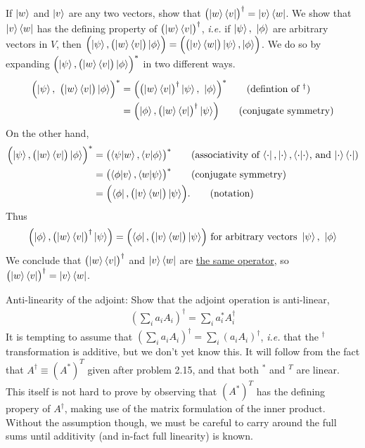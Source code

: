  If $\ket{w}$ and $\ket{v}$ are any two vectors, show that $\bigl(\ket{w}\bra{v}\bigr)^\dagger = \ket{v}\bra{w}$.
\Soln We show that $\ket{v}\bra{w}$ has the defining property of $\bigl(\ket{w}\bra{v}\bigr)^\dagger$, \textit{i.e.} if $\ket{\psi},\ \ket{\phi}$ are arbitrary vectors in $V$, then $\Bigl(\ket{\psi}, \bigl(\ket{w}\bra{v}\bigr)\ket{\phi}\Bigr) = \Bigl(\bigl(\ket{v}\bra{w}\bigr)\ket{\psi}, \ket{\phi}\Bigr)$.  We do so by expanding $\Bigl(\ket{\psi}, \bigl(\ket{w}\bra{v}\bigr)\ket{\phi}\Bigr)^*$ in two different ways. 
\begin{align*}
	\Bigl(\ket{\psi},\ \bigl(\ket{w}\bra{v}\bigr) \ket{\phi}\Bigr)^* &=
	\Bigl(\bigl(\ket{w}\bra{v}\bigr)^\dagger \ket{\psi},\  \ket{\phi}\Bigr)^* \tag{defintion of $^\dagger$}\\
	&= \Bigl(\ket{\phi},\bigl(\ket{w}\bra{v}\bigr)^\dagger \ket{\psi} \Bigr) \tag{conjugate symmetry}
\end{align*}
On the other hand,
\begin{align*}
	\Bigl(\ket{\psi},\bigl(\ket{w}\bra{v}\bigr) \ket{\phi}\Bigr)^*
	&= \bigl(\braket{\psi | w}, \braket{v | \phi}\bigr)^* \tag{associativity of $\bra{\cdot},\ket{\cdot}, \braket{\cdot|\cdot}$, and $\ket{\cdot}\bra{\cdot}$}\\
	&= \bigl(\braket{\phi | v}, \braket{w | \psi}\bigr)^* \tag{conjugate symmetry}\\
	&= \Bigl(\bra{\phi}, \bigl(\ket{v}\bra{w}\bigr)\ket{\psi}\Bigr). \tag{notation}
\end{align*}
Thus
\begin{align*}
	\Bigl(\ket{\phi},\bigl(\ket{w}\bra{v}\bigr)^\dagger \ket{\psi} \Bigr) = \Bigl(\bra{\phi}, \bigl(\ket{v}\bra{w}\bigr)\ket{\psi}\Bigr) \text{ for arbitrary vectors } \ket{\psi},\ \ket{\phi}
\end{align*}
We conclude that $\bigl(\ket{w}\bra{v}\bigr)^\dagger$ and $\ket{v}\bra{w}$ are \underline{the same operator}, so $\bigl(\ket{w}\bra{v}\bigr)^\dagger = \ket{v}\bra{w}$.

 Anti-linearity of the adjoint: Show that the adjoint operation is anti-linear,
\begin{align*}\left(\sum_ia_iA_i\right)^\dagger = \sum_ia_i^*A_i^\dagger\end{align*}
\Soln It is tempting to assume that $\left(\sum_ia_iA_i\right)^\dagger = \sum_i(a_iA_i)^\dagger$, \textit{i.e.} that the $^\dagger$ transformation is additive, but we don't yet know this. It will follow from the fact that $A^\dagger \equiv (A^*)^T$ given after problem 2.15, and that both $^*$ and $^T$ are linear. This itself is not hard to prove by observing that $(A^*)^T$ has the defining propery of $A^\dagger$, making use of the matrix formulation of the inner product.  Without the assumption though, we must be careful to carry around the full sums until additivity (and in-fact full linearity) is known.

